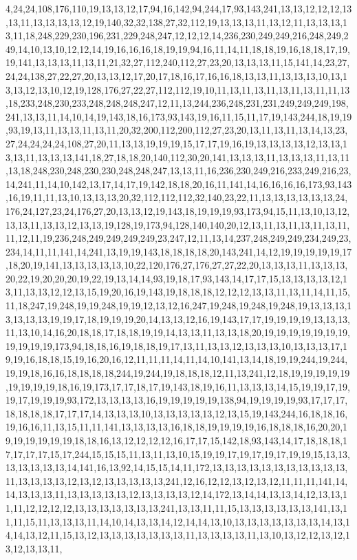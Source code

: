4,24,24,108,176,110,19,13,13,12,17,94,16,142,94,244,17,93,143,241,13,13,12,12,12,13,13,11,13,13,13,13,12,19,140,32,32,138,27,32,112,19,13,13,13,11,13,12,11,13,13,13,13,11,18,248,229,230,196,231,229,248,247,12,12,12,14,236,230,249,249,216,248,249,249,14,10,13,10,12,12,14,19,16,16,16,18,19,19,94,16,11,14,11,18,18,19,16,18,18,17,19,19,141,13,13,13,11,13,11,21,32,27,112,240,112,27,23,20,13,13,13,11,15,141,14,23,27,24,24,138,27,22,27,20,13,13,12,17,20,17,18,16,17,16,16,18,13,13,11,13,13,13,10,13,13,13,12,13,10,12,19,128,176,27,22,27,112,112,19,10,11,13,11,13,11,13,11,13,11,11,13,18,233,248,230,233,248,248,248,247,12,11,13,244,236,248,231,231,249,249,249,198,241,13,13,11,14,10,14,19,143,18,16,173,93,143,19,16,11,15,11,17,19,143,244,18,19,19,93,19,13,11,13,13,11,13,11,20,32,200,112,200,112,27,23,20,13,11,13,11,13,14,13,23,27,24,24,24,24,108,27,20,11,13,13,19,19,19,15,17,17,19,16,19,13,13,13,13,12,13,13,13,13,11,13,13,13,141,18,27,18,18,20,140,112,30,20,141,13,13,13,11,13,13,13,11,13,11,13,18,248,230,248,230,230,248,248,247,13,13,11,16,236,230,249,216,233,249,216,23,14,241,11,14,10,142,13,17,14,17,19,142,18,18,20,16,11,141,14,16,16,16,16,173,93,143,16,19,11,11,13,10,13,13,13,20,32,112,112,112,32,140,23,22,11,13,13,13,13,13,13,24,176,24,127,23,24,176,27,20,13,13,12,19,143,18,19,19,19,93,173,94,15,11,13,10,13,12,13,13,11,13,13,12,13,13,19,128,19,173,94,128,140,140,20,12,13,11,13,11,13,11,13,11,11,12,11,19,236,248,249,249,249,249,23,247,12,11,13,14,237,248,249,249,234,249,23,234,14,11,11,141,14,241,13,19,19,143,18,18,18,18,20,143,241,14,12,19,19,19,19,19,17,18,20,19,141,13,13,13,13,13,10,22,120,176,27,176,27,27,22,20,13,13,13,11,13,13,13,20,22,19,20,20,20,19,22,19,13,14,14,93,19,18,17,93,143,14,17,17,15,13,13,13,13,12,13,11,13,13,12,12,13,15,19,20,16,19,143,19,18,18,18,12,12,12,13,13,11,13,11,14,11,15,11,18,247,19,248,19,19,248,19,19,12,13,12,16,247,19,248,19,248,19,248,19,13,13,13,13,13,13,13,19,19,17,18,19,19,19,20,14,13,13,12,16,19,143,17,17,19,19,19,19,13,13,13,11,13,10,14,16,20,18,18,17,18,18,19,19,14,13,13,11,13,13,18,20,19,19,19,19,19,19,19,19,19,19,19,173,94,18,18,16,19,18,18,19,17,13,11,13,13,12,13,13,13,10,13,13,13,17,19,19,16,18,18,15,19,16,20,16,12,11,11,11,14,11,14,10,141,13,14,18,19,19,244,19,244,19,19,18,16,16,18,18,18,18,244,19,244,19,18,18,18,12,11,13,241,12,18,19,19,19,19,19,19,19,19,19,18,16,19,173,17,17,18,17,19,143,18,19,16,11,13,13,13,14,15,19,19,17,19,19,17,19,19,19,93,172,13,13,13,13,16,19,19,19,19,19,138,94,19,19,19,19,93,17,17,17,18,18,18,18,17,17,17,14,13,13,13,10,13,13,13,13,13,12,13,15,19,143,244,16,18,18,16,19,16,16,11,13,15,11,11,141,13,13,13,13,16,18,18,19,19,19,19,16,18,18,18,16,20,20,19,19,19,19,19,19,18,18,16,13,12,12,12,12,16,17,17,15,142,18,93,143,14,17,18,18,18,17,17,17,17,15,17,244,15,15,15,11,13,11,13,10,15,19,19,17,19,17,19,17,19,19,15,13,13,13,13,13,13,13,14,141,16,13,92,14,15,15,14,11,172,13,13,13,13,13,13,13,13,13,13,13,11,13,13,13,13,12,13,12,13,13,13,13,13,241,12,16,12,12,13,12,13,12,11,11,11,141,14,14,13,13,13,11,13,13,13,13,13,12,13,13,13,13,12,14,172,13,14,14,13,13,14,12,13,13,11,11,12,12,12,12,13,13,13,13,13,13,13,241,13,13,11,11,15,13,13,13,13,13,13,141,13,11,11,15,11,13,13,13,11,14,10,14,13,13,14,12,14,14,13,10,13,13,13,13,13,13,13,14,13,14,14,13,12,11,15,13,12,13,13,13,13,13,13,13,11,13,13,13,13,11,13,10,13,12,12,13,12,13,12,13,13,11,